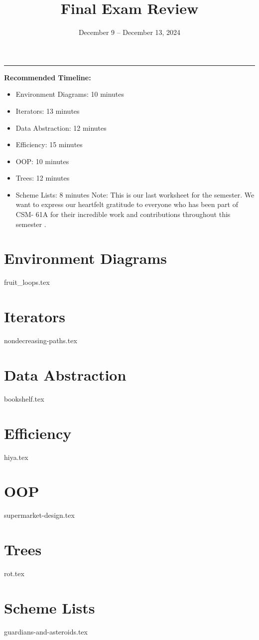 \documentclass{exam}
\title{Final Exam Review}
\date{December 9 -- December 13, 2024}
\begin{document}
\maketitle\rule{\textwidth}{0.15em}

\begin{meta}

\textbf{Recommended Timeline:}
\begin{itemize}
    \item Environment Diagrams: 10 minutes
    \item Iterators: 13 minutes
    \item Data Abstraction: 12 minutes
    \item Efficiency: 15 minutes
    \item OOP: 10 minutes
    \item Trees: 12 minutes
    \item Scheme Lists: 8 minutes
    \newline 
Note: This is our last worksheet for the semester. We want to express our heartfelt gratitude to everyone who has been part of CSM- 61A for their incredible work and contributions throughout this semester .
\end{itemize}
\end{meta}

\begin{questions}
\section{Environment Diagrams}
{fruit_loops.tex}

\section{Iterators}
{nondecreasing-paths.tex}

\section{Data Abstraction}
{bookshelf.tex}

\section{Efficiency}
{hiya.tex}

\section{OOP}
{supermarket-design.tex}

\section{Trees}
{rot.tex}

\section{Scheme Lists}
{guardians-and-asteroids.tex}
\end{questions}
\end{document}
